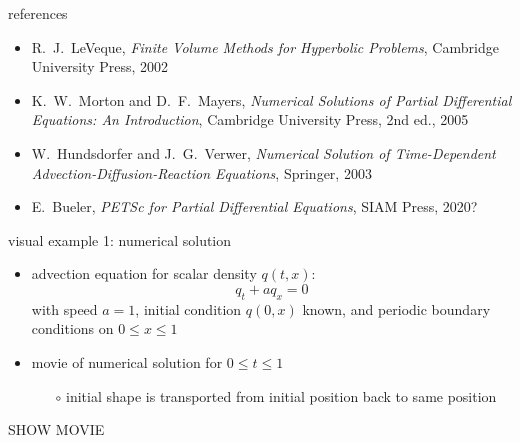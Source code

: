 \documentclass[10pt,hyperref]{beamer}
\begin{document}
\begin{frame}{references}
\begin{itemize}
\item {\large \alert{R.~J.~LeVeque, \emph{Finite Volume Methods for Hyperbolic Problems}, Cambridge University Press, 2002}}

\bigskip
\item K.~W.~Morton and D.~F.~Mayers, \emph{Numerical Solutions of Partial Differential Equations: An Introduction}, Cambridge University Press, 2nd ed., 2005
\item W.~Hundsdorfer and J.~G.~Verwer, \emph{Numerical Solution of Time-Dependent Advection-Diffusion-Reaction Equations}, Springer, 2003
\item E.~Bueler, \emph{PETSc for Partial Differential Equations}, SIAM Press, 2020?
\end{itemize}
\end{frame}


\begin{frame}{visual example 1: numerical solution}

\begin{itemize}
\item advection equation for scalar density $q(t,x)$:
    $$q_t + a q_x = 0$$
with speed $a=1$, initial condition $q(0,x)$ known, and periodic boundary conditions on $0\le x \le 1$
\item movie of numerical solution for $0\le t \le 1$
    \begin{itemize}
    \item[$\circ$] initial shape is transported from initial position back to same position
    \end{itemize}
\end{itemize}

\vspace{10mm}
\begin{center}
\alert{SHOW MOVIE}
\end{center}
\vspace{10mm}

\end{frame}
\end{document}

